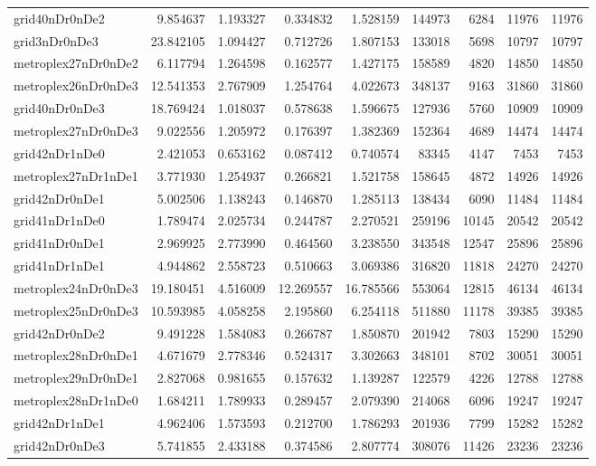 \documentclass[../../../thesis.tex]{subfiles}
\begin{document}
\begin{longtable}{|l|r|r|r|r|r|r|r|r|}
grid40nDr0nDe2 & 9.854637 & 1.193327 & 0.334832 & 1.528159 & 144973 & 6284 & 11976 & 11976 \\
grid3nDr0nDe3 & 23.842105 & 1.094427 & 0.712726 & 1.807153 & 133018 & 5698 & 10797 & 10797 \\
metroplex27nDr0nDe2 & 6.117794 & 1.264598 & 0.162577 & 1.427175 & 158589 & 4820 & 14850 & 14850 \\
metroplex26nDr0nDe3 & 12.541353 & 2.767909 & 1.254764 & 4.022673 & 348137 & 9163 & 31860 & 31860 \\
grid40nDr0nDe3 & 18.769424 & 1.018037 & 0.578638 & 1.596675 & 127936 & 5760 & 10909 & 10909 \\
metroplex27nDr0nDe3 & 9.022556 & 1.205972 & 0.176397 & 1.382369 & 152364 & 4689 & 14474 & 14474 \\
grid42nDr1nDe0 & 2.421053 & 0.653162 & 0.087412 & 0.740574 & 83345 & 4147 & 7453 & 7453 \\
metroplex27nDr1nDe1 & 3.771930 & 1.254937 & 0.266821 & 1.521758 & 158645 & 4872 & 14926 & 14926 \\
grid42nDr0nDe1 & 5.002506 & 1.138243 & 0.146870 & 1.285113 & 138434 & 6090 & 11484 & 11484 \\
grid41nDr1nDe0 & 1.789474 & 2.025734 & 0.244787 & 2.270521 & 259196 & 10145 & 20542 & 20542 \\
grid41nDr0nDe1 & 2.969925 & 2.773990 & 0.464560 & 3.238550 & 343548 & 12547 & 25896 & 25896 \\
grid41nDr1nDe1 & 4.944862 & 2.558723 & 0.510663 & 3.069386 & 316820 & 11818 & 24270 & 24270 \\
metroplex24nDr0nDe3 & 19.180451 & 4.516009 & 12.269557 & 16.785566 & 553064 & 12815 & 46134 & 46134 \\
metroplex25nDr0nDe3 & 10.593985 & 4.058258 & 2.195860 & 6.254118 & 511880 & 11178 & 39385 & 39385 \\
grid42nDr0nDe2 & 9.491228 & 1.584083 & 0.266787 & 1.850870 & 201942 & 7803 & 15290 & 15290 \\
metroplex28nDr0nDe1 & 4.671679 & 2.778346 & 0.524317 & 3.302663 & 348101 & 8702 & 30051 & 30051 \\
metroplex29nDr0nDe1 & 2.827068 & 0.981655 & 0.157632 & 1.139287 & 122579 & 4226 & 12788 & 12788 \\
metroplex28nDr1nDe0 & 1.684211 & 1.789933 & 0.289457 & 2.079390 & 214068 & 6096 & 19247 & 19247 \\
grid42nDr1nDe1 & 4.962406 & 1.573593 & 0.212700 & 1.786293 & 201936 & 7799 & 15282 & 15282 \\
grid42nDr0nDe3 & 5.741855 & 2.433188 & 0.374586 & 2.807774 & 308076 & 11426 & 23236 & 23236 \\

\end{longtable}
\end{document}
